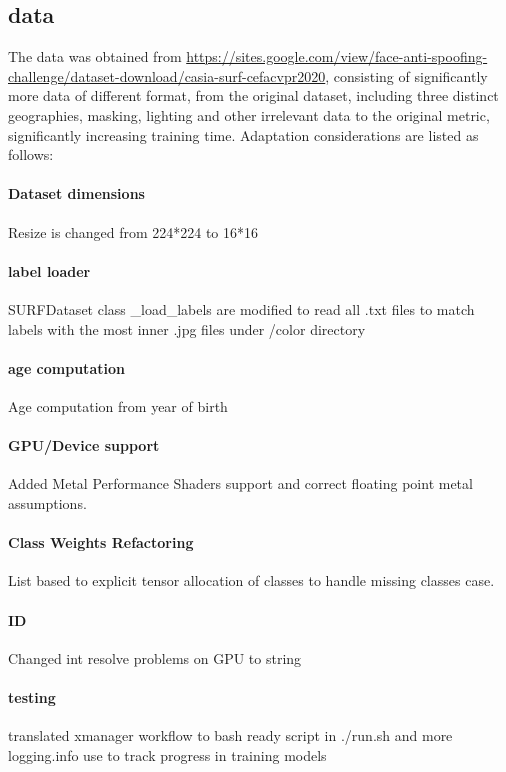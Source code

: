 \documentclass{surreydissertation}
\begin{document}
\subsection{data}
The data was obtained from \url{https://sites.google.com/view/face-anti-spoofing-challenge/dataset-download/casia-surf-cefacvpr2020}, consisting of significantly more data of different format, from the original dataset, including three distinct geographies, masking, lighting and other irrelevant data to the original metric, significantly increasing training time. Adaptation considerations are listed as follows:

\paragraph{Dataset dimensions} Resize is changed from 224*224 to 16*16
\paragraph{label loader} SURFDataset class \_load\_labels are modified to read all .txt files to match labels with the most inner .jpg files under /color directory
\paragraph{age computation} Age computation from year of birth
\paragraph{GPU/Device support} Added Metal Performance Shaders support and correct floating point metal assumptions.
\paragraph{Class Weights Refactoring} List based to explicit tensor allocation of classes to handle missing classes case.
\paragraph{ID} Changed int resolve problems on GPU to string
\paragraph{testing} translated xmanager workflow to bash ready script in ./run.sh and more logging.info use to track progress in training models


\end{document}
